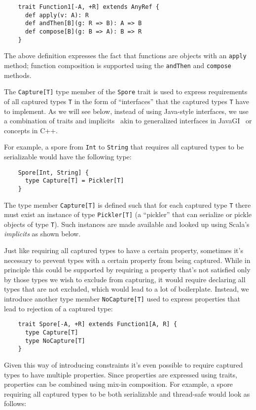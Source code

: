 \documentclass{llncs}
\begin{document}
\begin{lstlisting}
    trait Function1[-A, +R] extends AnyRef {
      def apply(v: A): R
      def andThen[B](g: R => B): A => B
      def compose[B](g: B => A): B => R
    }
\end{lstlisting}
\noindent
The above definition expresses the fact that functions are objects with an
\verb|apply| method; function composition is supported using the
\verb|andThen| and \verb|compose| methods.

The \verb|Capture[T]| type member of the \verb|Spore| trait is used to express
requirements of all captured types \verb|T| in the form of ``interfaces'' that
the captured types \verb|T| have to implement. As we will see below, instead
of using Java-style interfaces, we use a combination of traits and
implicits~\cite{Oliveira2010} akin to generalized interfaces in
JavaGI~\cite{WehrT11} or concepts in C++.

For example, a spore from \verb|Int| to \verb|String| that requires all
captured types to be serializable would have the following type:
\begin{lstlisting}
    Spore[Int, String] {
      type Capture[T] = Pickler[T]
    }
\end{lstlisting}
\noindent
The type member \verb|Capture[T]| is defined such that for each captured type
\verb|T| there must exist an instance of type \verb|Pickler[T]| (a ``pickler''
that can serialize or pickle objects of type \verb|T|). Such instances are
made available and looked up using Scala's {\em implicits} as shown below.

Just like requiring all captured types to have a certain property, sometimes
it's necessary to prevent types with a certain property from being captured.
While in principle this could be supported by requiring a property that's not
satisfied only by those types we wish to exclude from capturing, it would
require declaring all types that are not excluded, which would lead to a lot
of boilerplate. Instead, we introduce another type member \verb|NoCapture[T]|
used to express properties that lead to rejection of a captured type:

\begin{lstlisting}
    trait Spore[-A, +R] extends Function1[A, R] {
      type Capture[T]
      type NoCapture[T]
    }
\end{lstlisting}
\noindent
Given this way of introducing constraints it's even possible to require
captured types to have multiple properties. Since properties are expressed
using traits, properties can be combined using mix-in composition. For
example, a spore requiring all captured types to be both serializable and
thread-safe would look as follows:
\end{document}
